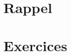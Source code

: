 \documentclass [a4paper, 11pt] {article}
\begin{document}
    \makeseancetitle
    \thispagestyle{firstpage}
    
    \part*{Rappel}
    
    
    
    \pagebreak
    \pagestyle{nextpages}
    
    
    
    \pagebreak
    \part*{Exercices}
    
    \begin{exercice}{1}
    
    \end{exercice}
    
    \begin{reponse}

    \end{reponse}
\end{document}
